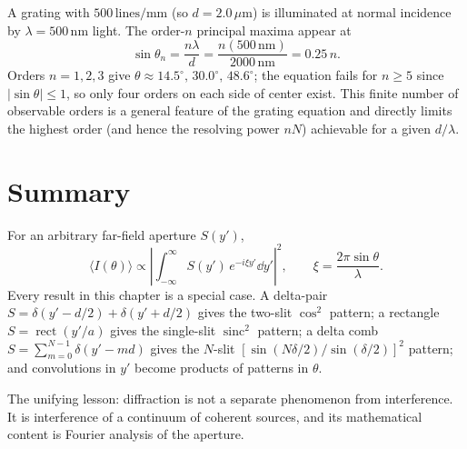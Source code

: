 \begin{example}
A grating with $500\,\text{lines/mm}$ (so $d = 2.0\,\mu\text{m}$) is illuminated at normal incidence by $\lambda = 500\,\text{nm}$ light. The order-$n$ principal maxima appear at
\begin{equation}
    \sin\theta_n = \frac{n\lambda}{d} = \frac{n (500\,\text{nm})}{2000\,\text{nm}} = 0.25\, n.
\end{equation}
Orders $n = 1,2,3$ give $\theta \approx 14.5^\circ,\, 30.0^\circ,\, 48.6^\circ$; the equation fails for $n \ge 5$ since $|\sin\theta|\le 1$, so only four orders on each side of center exist. This finite number of observable orders is a general feature of the grating equation and directly limits the highest order (and hence the resolving power $nN$) achievable for a given $d/\lambda$.
\end{example}

\section{Summary}

\begin{fact}
For an arbitrary far-field aperture $S(y')$,
\begin{equation}
    \langle I(\theta)\rangle \propto \left|\int_{-\infty}^{\infty} S(y')\, e^{-i \xi y'}\dd y'\right|^2, \qquad \xi = \frac{2\pi\sin\theta}{\lambda}.
\end{equation}
Every result in this chapter is a special case. A delta-pair $S = \delta(y'-d/2) + \delta(y'+d/2)$ gives the two-slit $\cos^2$ pattern; a rectangle $S = \operatorname{rect}(y'/a)$ gives the single-slit $\operatorname{sinc}^2$ pattern; a delta comb $S = \sum_{m=0}^{N-1} \delta(y' - m d)$ gives the $N$-slit $[\sin(N\delta/2)/\sin(\delta/2)]^2$ pattern; and convolutions in $y'$ become products of patterns in $\theta$.
\end{fact}

The unifying lesson: diffraction is not a separate phenomenon from interference. It is interference of a continuum of coherent sources, and its mathematical content is Fourier analysis of the aperture.
